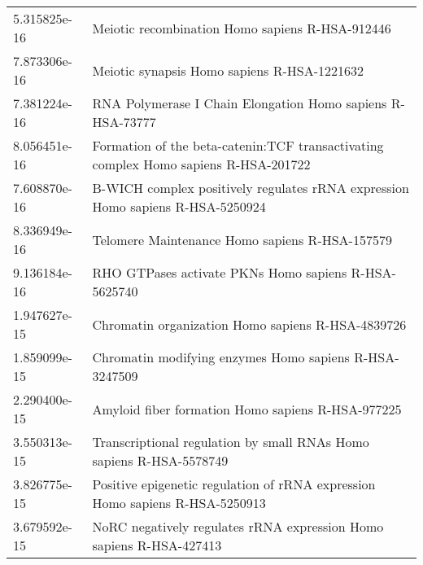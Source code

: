 \begin{longtable}{p{2.4cm}p{14.5cm}}
             5.315825e-16 &                                                                                       Meiotic recombination Homo sapiens R-HSA-912446 \\
             7.873306e-16 &                                                                                           Meiotic synapsis Homo sapiens R-HSA-1221632 \\
             7.381224e-16 &                                                                            RNA Polymerase I Chain Elongation Homo sapiens R-HSA-73777 \\
             8.056451e-16 &                                                   Formation of the beta-catenin:TCF transactivating complex Homo sapiens R-HSA-201722 \\
             7.608870e-16 &                                                        B-WICH complex positively regulates rRNA expression Homo sapiens R-HSA-5250924 \\
             8.336949e-16 &                                                                                        Telomere Maintenance Homo sapiens R-HSA-157579 \\
             9.136184e-16 &                                                                                  RHO GTPases activate PKNs Homo sapiens R-HSA-5625740 \\
             1.947627e-15 &                                                                                     Chromatin organization Homo sapiens R-HSA-4839726 \\
             1.859099e-15 &                                                                                Chromatin modifying enzymes Homo sapiens R-HSA-3247509 \\
             2.290400e-15 &                                                                                     Amyloid fiber formation Homo sapiens R-HSA-977225 \\
             3.550313e-15 &                                                                   Transcriptional regulation by small RNAs Homo sapiens R-HSA-5578749 \\
             3.826775e-15 &                                                          Positive epigenetic regulation of rRNA expression Homo sapiens R-HSA-5250913 \\
             3.679592e-15 &                                                                   NoRC negatively regulates rRNA expression Homo sapiens R-HSA-427413 \\

\end{longtable}
